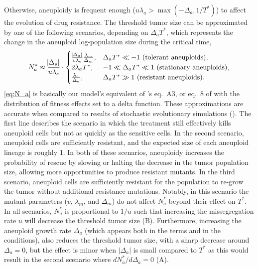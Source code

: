 \documentclass[12pt]{extarticle}
\begin{document}
Otherwise, aneuploidy is frequent enough ($u\lambda_a > \max{\left(-\Delta_a, 1/T^*\right)}$) to affect the evolution of drug resistance. 
The threshold tumor size can be approximated by one of the following scenarios, depending on $\Delta_a T^*$, which represents the change in the aneuploid log-population size during the critical time,
\begin{equation}  \label{eq:N_a}
\begin{aligned}
N_a^* \approx 
  \frac{\abs{\Delta_s}}{u\lambda_s} \cdot \begin{cases}
    \frac{\abs{\Delta_a}}{v\lambda_a}  \frac{\lambda_m}{\Delta_m} ,&
  \Delta_a T^* \ll -1 \text{ (tolerant aneuploids)},\\ 
  2\lambda_a T^* ,&
  -1 \ll \Delta_a T^* \ll 1  \text{ (stationary aneuploids)},\\ 
  \frac{\lambda_a}{\Delta_a} ,&
   \Delta_a T^* \gg 1 \text{ (resistant aneuploids)}.
  \end{cases}
\end{aligned}
\end{equation}
\cref{eq:N_a} is basically our model's equivalent of \citet{iwasa2004evolutionary}'s eq.~A3, or eq.~8 of \citet{osmond_genetic_2020} with the distribution of fitness effects set to a delta function. %
These approximations are accurate when compared to results of stochastic evolutionary simulations (). 
The first line describes the scenario in which the treatment still effectively kills aneuploid cells but not as quickly as the sensitive cells. 
In the second scenario, aneuploid cells are sufficiently resistant, and the expected size of each aneuploid lineage is roughly 1.
In both of these scenarios, aneuploidy increases the probability of rescue by slowing or halting the decrease in the tumor population size, allowing more opportunities to produce resistant mutants. 
In the third scenario, aneuploid cells are sufficiently resistant for the population to re-grow the tumor without additional resistance mutations.
Notably, in this scenario the mutant parameters ($v$, $\lambda_m$, and $\Delta_m$) do not affect $N_a^*$ beyond their effect on $T^*$.
In all scenarios, $N_a^*$ is proportional to $1/u$ such that increasing the missegregation rate $u$ will decrease the threshold tumor size (B).
Furthermore, increasing the aneuploid growth rate $\Delta_a$ (which appears both in the terms and in the conditions), also reduces the threshold tumor size, with a sharp decrease around $\Delta_a=0$, but the effect is minor when $|\Delta_a|$ is small compared to $T^*$ as this would result in the second scenario where  $dN_a^*/d\Delta_a=0$ (A). 
\end{document}

